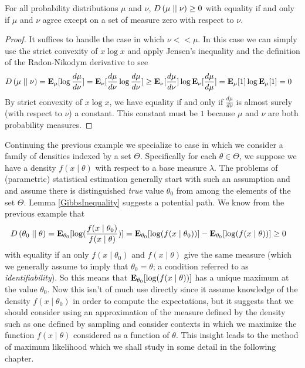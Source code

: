 \begin{lem}\label{GibbsInequality}For all
  probability distributions $\mu$ and $\nu$, $\kldiv{\mu}{\nu} \geq 0$
  with equality if and only if $\mu$ and $\nu$ agree except on a set
  of measure zero with respect to $\nu$.
\end{lem}
\begin{proof}
It suffices to handle the case in which $\nu << \mu$.  In this case we
can simply use the strict convexity of $x \log x$ and apply Jensen's
inequality and the definition of the Radon-Nikodym derivative to see
\begin{align*}
\kldiv{\mu}{\nu} &= \sexpectation{\log \frac{d\mu}{d\nu}}{\mu} = \sexpectation{\frac{d\mu}{d\nu}\log \frac{d\mu}{d\nu}}{\nu} \geq
\sexpectation{\frac{d\mu}{d\nu}}{\nu} \log \sexpectation{\frac{d\mu}{d\mu}}{\nu} = 
\sexpectation{1}{\mu} \log \sexpectation{1}{\mu} = 0
\end{align*}
By strict convexity of $x \log x$, we have equality if and only if $\frac{d\mu}{d\nu}$ is
almost surely (with respect to $\nu$) a constant.  This constant must be $1$ because $\mu$ and
$\nu$ are both probability measures.  
\end{proof}

\begin{examp}Continuing the previous example we specialize to case in
  which we consider a family of densities indexed by a set $\Theta$.
  Specifically for each $\theta \in \Theta$, we suppose we have a
  density $f(x \mid \theta)$ with respect to a base measure
  $\lambda$.  The problems of (parametric) statistical estimation generally start
  with such an assumption and and assume there is distinguished
  \emph{true} value $\theta_0$ from among the elements of the set
  $\Theta$.  Lemma \ref{GibbsInequality} suggests a potential path.  We know
  from the previous example that 
\begin{align*}
\kldiv{\theta_0}{\theta} &= \sexpectation{ \log( \frac{f(x \mid \theta_0)}{f(x
  \mid \theta)})}{\theta_0} = \sexpectation{ \log( f(x \mid \theta_0))
}{\theta_0} - \sexpectation{ \log( f(x \mid \theta))
}{\theta_0} \geq 0
\end{align*}
with equality if an only $f(x \mid \theta_0)$ and $f(x \mid \theta)$
give the same measure (which we generally assume to imply that
$\theta_0 = \theta$; a condition referred to as
\emph{identifiability}).  So this means that $\sexpectation{ \log( f(x \mid \theta))
}{\theta_0}$ has a unique maximum at the value $\theta_0$.  Now this
isn't of much use directly since it assume knowledge of the density
$f(x \mid \theta_0)$ in order to compute the expectations, but it
suggests that we should consider using an approximation of the measure
defined by the density such as one defined by sampling and consider
contexts in which we maximize the function $f(x \mid \theta)$
considered as a function of $\theta$.  This insight leads to the
method of maximum likelihood which we shall study in some detail in
the following chapter.  
\end{examp}

